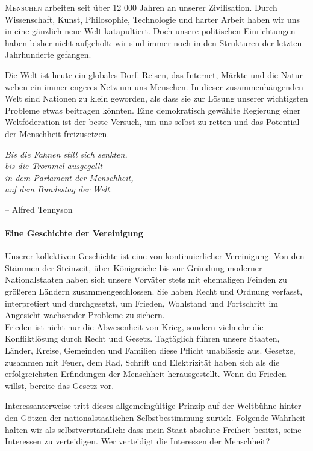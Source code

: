 \documentclass[11pt,a4paper]{article}
\begin{document}
\begin{multicols}{2}
\lettrine[lraise=0.1, lines=2]{\textsc{M}}{enschen} arbeiten seit über 12 000 Jahren an unserer Zivilisation. Durch Wissenschaft, Kunst, Philosophie, Technologie und harter Arbeit haben wir uns in eine gänzlich neue Welt katapultiert. Doch unsere politischen Einrichtungen haben bisher nicht aufgeholt: wir sind immer noch in den Strukturen der letzten Jahrhunderte gefangen.

\noindent Die Welt ist heute ein globales Dorf. Reisen, das Internet, Märkte und die Natur weben ein immer engeres Netz um uns Menschen. In dieser zusammenhängenden Welt sind Nationen zu klein geworden, als dass sie zur Lösung unserer wichtigsten Probleme etwas beitragen könnten. Eine demokratisch gewählte Regierung einer Weltföderation ist der beste Versuch, um uns selbst zu retten und das Potential der Menschheit freizusetzen.


\begin{shaded*}
\noindent \textit{Bis die Fahnen still sich senkten,\\
bis die Trommel ausgegellt\\
\noindent in dem Parlament der Menschheit, \\
auf dem Bundestag der Welt.}
\begin{flushright}
-- Alfred Tennyson
\end{flushright}
\vspace{-12pt}
\end{shaded*}


\paragraph{Eine Geschichte der Vereinigung}

Unserer kollektiven Geschichte ist eine von kontinuierlicher Vereinigung. Von den Stämmen der Steinzeit, über Königreiche bis zur Gründung moderner Nationalstaaten haben sich unsere Vorväter stets mit ehemaligen Feinden zu größeren Ländern zusammengeschlossen. Sie haben Recht und Ordnung verfasst, interpretiert und durchgesetzt, um Frieden, Wohlstand und Fortschritt im Angesicht wachsender Probleme zu sichern.\\
\noindent Frieden ist nicht nur die Abwesenheit von Krieg, sondern vielmehr die Konfliktlösung durch Recht und Gesetz. Tagtäglich führen unsere Staaten, Länder, Kreise, Gemeinden und Familien diese Pflicht unablässig aus. Gesetze, zusammen mit Feuer, dem Rad, Schrift und Elektrizität haben sich als die erfolgreichsten Erfindungen der Menschheit herausgestellt. Wenn du Frieden willst, bereite das Gesetz vor.

\noindent Interessanterweise tritt dieses allgemeingültige Prinzip auf der Weltbühne hinter den Götzen der nationalstaatlichen Selbstbestimmung zurück. Folgende Wahrheit halten wir als selbstverständlich: dass mein Staat absolute Freiheit besitzt, seine Interessen zu verteidigen. Wer verteidigt die Interessen der Menschheit?

\end{multicols}
\end{document}

